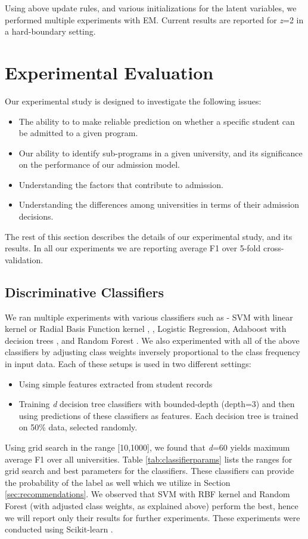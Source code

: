 \documentclass{sig-alternate-05-2015}
\begin{document}
Using above update rules, and various initializations for the latent variables, we performed multiple experiments with EM. Current results are reported for \textit{z}=2 in a hard-boundary setting.


\section{Experimental Evaluation}
\label{sec:experiments}
Our experimental study is designed to investigate the following issues:
\begin{itemize}
\item The ability to to make reliable prediction on whether a specific student can be admitted to a given program.
\item Our ability to identify sub-programs in a given university, and its significance on the performance of our admission model.
\item Understanding the factors that contribute to admission.
\item Understanding the differences among universities in terms of their admission decisions.
\end{itemize}
The rest of this section describes the details of our experimental study, and its results. In all our experiments we are reporting average F1 over 5-fold cross-validation.

\subsection{Discriminative Classifiers}
\label{subsec:supervised-exp}
We ran multiple experiments with various classifiers such as - SVM with linear kernel or Radial Basis Function kernel \cite{libsvm}, \cite{svmtutorial}, Logistic Regression, Adaboost \cite{adaboost} with decision trees \cite{decisiontree}, and Random Forest \cite{randomforest}. We also experimented with all of the above classifiers by adjusting class weights inversely proportional to the class frequency in input data. Each of these setups is used in two different settings:
\begin{itemize}
\item Using simple features extracted from student records
\item Training \textit{d} decision tree classifiers with bounded-depth (depth=3) and then using predictions of these classifiers as features. Each decision tree is trained on 50\% data, selected randomly.
\end{itemize}
Using grid search in the range [10,1000], we found that \textit{d}=60 yields maximum average F1 over all universities. Table \ref{tab:classifierparams} lists the ranges for grid search and best parameters for the classifiers. These classifiers can provide the probability of the label as well which we utilize in Section \ref{sec:recommendations}. We observed that SVM with RBF kernel and Random Forest (with adjusted class weights, as explained above) perform the best, hence we will report only their results for further experiments. These experiments were conducted using Scikit-learn \cite{scikit-learn}.
\end{document}
